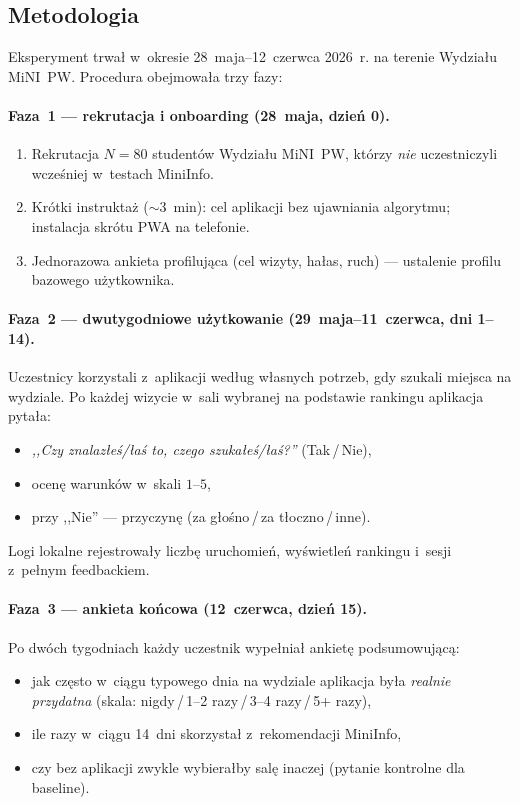 \documentclass[14pt,a4paper]{extarticle}
\begin{document}
\subsection{Metodologia}

Eksperyment trwał w~okresie 28~maja--12~czerwca 2026~r. na terenie Wydziału MiNI~PW. Procedura obejmowała trzy fazy:

\paragraph{Faza~1 --- rekrutacja i onboarding (28~maja, dzień 0).}
\begin{enumerate}
    \item Rekrutacja $N = 80$ studentów Wydziału MiNI~PW, którzy \emph{nie} uczestniczyli wcześniej w~testach MiniInfo.
    \item Krótki instruktaż ($\sim$3~min): cel aplikacji bez ujawniania algorytmu; instalacja skrótu PWA na telefonie.
    \item Jednorazowa ankieta profilująca (cel wizyty, hałas, ruch) --- ustalenie profilu bazowego użytkownika.
\end{enumerate}

\paragraph{Faza~2 --- dwutygodniowe użytkowanie (29~maja--11~czerwca, dni 1--14).}
Uczestnicy korzystali z~aplikacji według własnych potrzeb, gdy szukali miejsca na wydziale. Po każdej wizycie w~sali wybranej na podstawie rankingu aplikacja pytała:
\begin{itemize}
    \item \emph{,,Czy znalazłeś/łaś to, czego szukałeś/łaś?''} (Tak\,/\,Nie),
    \item ocenę warunków w~skali $1$--$5$,
    \item przy ,,Nie'' --- przyczynę (za głośno\,/\,za tłoczno\,/\,inne).
\end{itemize}
Logi lokalne rejestrowały liczbę uruchomień, wyświetleń rankingu i~sesji z~pełnym feedbackiem.

\paragraph{Faza~3 --- ankieta końcowa (12~czerwca, dzień 15).}
Po dwóch tygodniach każdy uczestnik wypełniał ankietę podsumowującą:
\begin{itemize}
    \item jak często w~ciągu typowego dnia na wydziale aplikacja była \emph{realnie przydatna} (skala: nigdy\,/\,1--2 razy\,/\,3--4 razy\,/\,5+ razy),
    \item ile razy w~ciągu 14~dni skorzystał z~rekomendacji MiniInfo,
    \item czy bez aplikacji zwykle wybierałby salę inaczej (pytanie kontrolne dla baseline).
\end{itemize}
\end{document}
